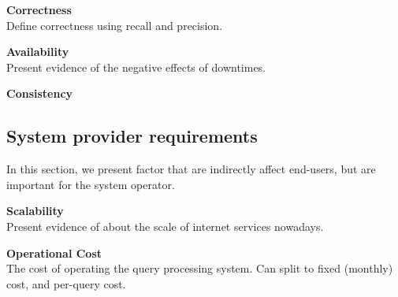 \textbf{Correctness} \\
  Define correctness using recall and precision.

\textbf{Availability} \\
  Present evidence of the negative effects of downtimes.

\textbf{Consistency}

\subsection{System provider requirements}
In this section, we present factor that are indirectly affect end-users, but are
important for the system operator.

\textbf{Scalability} \\
Present evidence of about the scale of internet services nowadays.

\textbf{Operational Cost} \\
The cost of operating the query processing system.
Can split to fixed (monthly) cost, and per-query cost.
